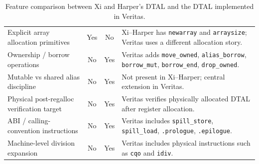 \begin{table}[H]
\begin{tabular}{p{} c c p{}}
    Explicit array allocation primitives       & Yes                 & No               & Xi--Harper has \texttt{newarray} and \texttt{arraysize}; Veritas uses a different allocation story.                          \\
    Ownership / borrow operations              & No                  & Yes              & Veritas adds \texttt{move\_owned}, \texttt{alias\_borrow}, \texttt{borrow\_mut}, \texttt{borrow\_end}, \texttt{drop\_owned}. \\
    Mutable vs shared alias discipline         & No                  & Yes              & Not present in Xi--Harper; central extension in Veritas.                                                                     \\
    Physical post-regalloc verification target & No                  & Yes              & Veritas verifies physically allocated DTAL after register allocation.                                                        \\
    ABI / calling-convention instructions      & No                  & Yes              & Veritas includes \texttt{spill\_store}, \texttt{spill\_load}, \texttt{.prologue}, \texttt{.epilogue}.                        \\
    Machine-level division expansion           & No                  & Yes              & Veritas includes physical instructions such as \texttt{cqo} and \texttt{idiv}.                                               \\
    \hline
  \end{tabular}
  \caption{Feature comparison between Xi and Harper's DTAL and the DTAL implemented in Veritas.}
  \label{tab:dtal-xi-harper-comparison}
\end{table}
